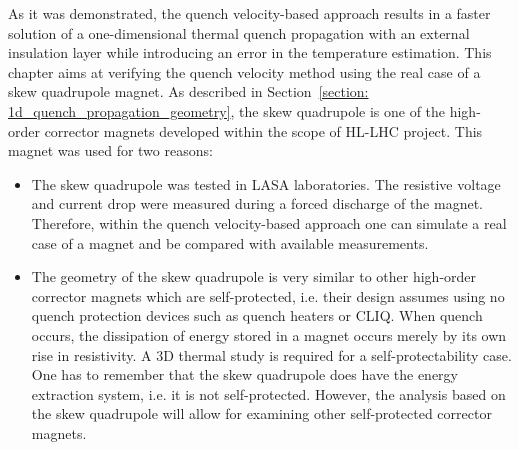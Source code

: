 As it was demonstrated, the quench velocity-based approach results in a faster solution of a one-dimensional thermal quench propagation with an external insulation layer while introducing an error in the temperature estimation. This chapter aims at verifying the quench velocity method using the real case of a skew quadrupole magnet.
As described in Section~\ref{section: 1d_quench_propagation_geometry}, the skew quadrupole is one of the high-order corrector magnets developed within the scope of HL-LHC project. This magnet was used for two reasons: 
\begin{itemize}
    \item The skew quadrupole was tested in LASA laboratories. The resistive voltage and current drop were measured during a forced discharge of the magnet. Therefore, within the quench velocity-based approach one can simulate a real case of a magnet and be compared with available measurements. 
    \item The geometry of the skew quadrupole is very similar to other high-order corrector magnets which are self-protected, i.e. their design assumes using no quench protection devices such as quench heaters or CLIQ. When quench occurs, the dissipation of energy stored in a magnet occurs merely by its own rise in resistivity. A 3D thermal study is required for a self-protectability case. One has to remember that the skew quadrupole does have the energy extraction system, i.e. it is not self-protected. However, the analysis based on the skew quadrupole will allow for examining other self-protected corrector magnets.
\end{itemize}
